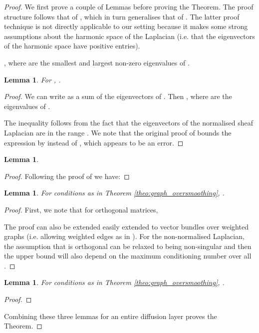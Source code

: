\documentclass{article}
\newtheorem{lemma}[theorem]{Lemma}
\begin{document}
\GraphOversmoothing*
\begin{proof}
We first prove a couple of Lemmas before proving the Theorem. The proof structure follows that of \citet{cai2020note}, which in turn generalises that of \citet{oono2019graph}. The latter proof technique is not directly applicable to our setting because it makes some strong assumptions about the harmonic space of the Laplacian (i.e. that the eigenvectors of the harmonic space have positive entries). 

, where  are the smallest and largest non-zero eigenvalues of .

\begin{lemma}
For , .
\end{lemma}

\begin{proof}
We can write  as a sum of the eigenvectors  of . Then , where  are the eigenvalues of . 

The inequality follows from the fact that the eigenvectors of the normalised sheaf Laplacian are in the range  \citep[Proposition 5.5]{hansen2019toward}. We note that the original proof of \citet{cai2020note} bounds the expression by  instead of , which appears to be an error. 
\end{proof}

\begin{lemma}

\end{lemma}

\begin{proof}
Following the proof of \citet{cai2020note} we have:

\end{proof}

\begin{lemma}\label{lemma:left_weight_energy_decrease}
For conditions as in Theorem \ref{theo:graph_oversmoothing}, . 
\end{lemma}
\begin{proof}
First, we note that for orthogonal matrices,  \citep[Lemma 4.4]{hansen2019toward}


The proof can also be extended easily extended to vector bundles over weighted graphs (i.e. allowing weighted edges as in \citet{hansen2019toward}). For the non-normalised Laplacian, the assumption that  is orthogonal can be relaxed to being non-singular and then the upper bound will also depend on the maximum conditioning number over all . 
\end{proof}

\begin{lemma}\label{lemma:activation_energy_decrease}
For conditions as in Theorem \ref{theo:graph_oversmoothing}, .
\end{lemma}

\begin{proof}
\end{proof}

Combining these three lemmas for an entire diffusion layer proves the Theorem. 
\end{proof}
\end{document}
